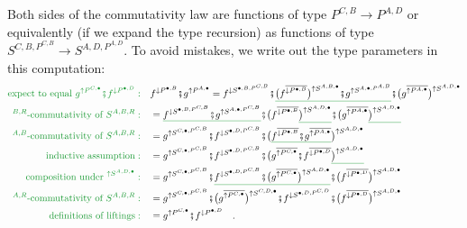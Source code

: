Both sides of the commutativity law are functions of type $P^{C,B}\rightarrow P^{A,D}$
or equivalently (if we expand the type recursion) as functions of
type $S^{C,B,P^{C,B}}\rightarrow S^{A,D,P^{A,D}}$. To avoid mistakes,
we write out the type parameters in this computation:
\begin{align*}
{\color{greenunder}\text{expect to equal }g^{\uparrow P^{C,\bullet}}\bef f^{\downarrow P^{\bullet,D}}:}\quad & f^{\downarrow P^{\bullet,B}}\bef g^{\uparrow P^{A,\bullet}}=f^{\downarrow S^{\bullet,B,P^{C,B}}}\bef\gunderline{\big(f^{\overline{\downarrow P^{\bullet,B}}}\big)^{\uparrow S^{A,B,\bullet}}\bef g^{\uparrow S^{A,\bullet,P^{A,B}}}}\bef\big(g^{\overline{\uparrow P^{A,\bullet}}}\big)^{\uparrow S^{A,D,\bullet}}\\
{\color{greenunder}^{B,R}\text{-commutativity of }S^{A,B,R}:}\quad & =\gunderline{f^{\downarrow S^{\bullet,B,P^{C,B}}}\bef g^{\uparrow S^{A,\bullet,P^{C,B}}}}\bef\big(f^{\overline{\downarrow P^{\bullet,B}}}\gunderline{\big)^{\uparrow S^{A,D,\bullet}}}\bef\big(g^{\overline{\uparrow P^{A,\bullet}}}\gunderline{\big)^{\uparrow S^{A,D,\bullet}}}\\
{\color{greenunder}^{A,B}\text{-commutativity of }S^{A,B,R}:}\quad & =g^{\uparrow S^{C,\bullet,P^{C,B}}}\bef f^{\downarrow S^{\bullet,D,P^{C,B}}}\bef\big(\gunderline{f^{\overline{\downarrow P^{\bullet,B}}}\bef g^{\overline{\uparrow P^{A,\bullet}}}}\big)^{\uparrow S^{A,D,\bullet}}\\
{\color{greenunder}\text{inductive assumption}:}\quad & =g^{\uparrow S^{C,\bullet,P^{C,B}}}\bef f^{\downarrow S^{\bullet,D,P^{C,B}}}\bef\big(g^{\overline{\uparrow P^{C,\bullet}}}\bef f^{\overline{\downarrow P^{\bullet,D}}}\gunderline{\big)^{\uparrow S^{A,D,\bullet}}}\\
{\color{greenunder}\text{composition under }^{\uparrow S^{A,D,\bullet}}:}\quad & =g^{\uparrow S^{C,\bullet,P^{C,B}}}\bef\gunderline{f^{\downarrow S^{\bullet,D,P^{C,B}}}\bef\big(g^{\overline{\uparrow P^{C,\bullet}}}\big)^{\uparrow S^{A,D,\bullet}}}\bef\big(f^{\overline{\downarrow P^{\bullet,D}}}\big)^{\uparrow S^{A,D,\bullet}}\\
{\color{greenunder}^{A,R}\text{-commutativity of }S^{A,B,R}:}\quad & =g^{\uparrow S^{C,\bullet,P^{C,B}}}\bef\big(g^{\overline{\uparrow P^{C,\bullet}}}\big)^{\uparrow S^{C,D,\bullet}}\bef f^{\downarrow S^{\bullet,D,P^{C,D}}}\bef\big(f^{\overline{\downarrow P^{\bullet,D}}}\big)^{\uparrow S^{A,D,\bullet}}\\
{\color{greenunder}\text{definitions of liftings}:}\quad & =g^{\uparrow P^{C,\bullet}}\bef f^{\downarrow P^{\bullet,D}}\quad.
\end{align*}

